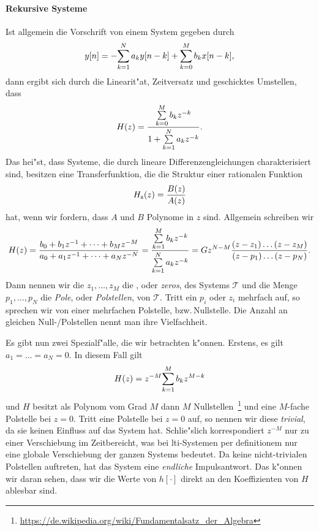 \paragraph{Rekursive Systeme}
Ist allgemein die Vorschrift von einem System gegeben durch
\[
y[n] = -{\sum\limits_{k=1}^{N}{a_k y[n-k]}} + {\sum\limits_{k=0}^{M}{b_k x[n - k]}},
\]
dann ergibt sich durch die Linearit"at, Zeitversatz und geschicktes Umstellen, dass
\[
    H(z) = \frac{{\sum\limits_{k=0}^{M}{b_k z^{-k}}}}{1 + {\sum\limits_{k=1}^{N}{a_k z^{-k}}}}.
\]
Das hei"st, dass Systeme, die durch lineare Differenzengleichungen charakterisiert sind, besitzen eine Transferfunktion, die die Struktur einer rationalen Funktion
\[
H_{\rm z}(z) = \frac{B(z)}{A(z)}
\]
hat, wenn wir fordern, dass $A$ und $B$ Polynome in $z$ sind.
Allgemein schreiben wir
\[
H(z) = 
    \frac{
        b_0 + b_1 z^{-1} + \dots + b_M z^{-M}
    }{
        a_0 + a_1 z^{-1} + \dots + a_N z^{-N}
    }
    = \frac{
        {\sum\limits_{k = 1}^{M}{b_k z^{-k}}}
    }{
        {\sum\limits_{k = 1}^{N}{a_k z^{-k}}}
    }
    = G z^{N - M} \frac{
        (z - z_1) \dots (z - z_M)
    }{
        (z - p_1) \dots (z - p_N)
    }.
\]
Dann nennen wir die $z_1, \dots, z_M$ die , oder \emph{zeros}, des Systems $\mathcal{T}$ und die Menge $p_1 ,\dots, p_N$ die \emph{Pole}, oder \emph{Polstellen}, von $\mathcal{T}$.
Tritt ein $p_i$ oder $z_i$ mehrfach auf, so sprechen wir von einer mehrfachen Polstelle, bzw.\,Nullstelle.
Die Anzahl an gleichen Null-/Polstellen nennt man ihre Vielfachheit.

Es gibt nun zwei Spezialf"alle, die wir betrachten k"onnen. 
Erstens, es gilt $a_1 = \dots = a_N = 0$. 
In diesem Fall gilt 
\[
H(z) = z^{-M} {\sum\limits_{k = 1}^{M}{b_k z^{M-k}}}
\]
und $H$ besitzt als Polynom vom Grad $M$ dann $M$ Nullstellen~\footnote{\url{https://de.wikipedia.org/wiki/Fundamentalsatz_der_Algebra}} und eine $M$-fache Polstelle bei $z=0$.
Tritt eine Polstelle bei $z=0$ auf, so nennen wir diese \emph{trivial}, da sie keinen Einfluss auf das System hat.
Schlie"slich korrespondiert $z^{-M}$ nur zu einer Verschiebung im Zeitbereicht, was bei \gls{lti}-Systemen per definitionem nur eine globale Verschiebung der ganzen Systems bedeutet.
Da keine nicht-trivialen Polstellen auftreten, hat das System eine \emph{endliche} Impulsantwort.
Das k"onnen wir daran sehen, dass wir die Werte von $h[\cdot]$ direkt an den Koeffizienten von $H$ ablesbar sind.


